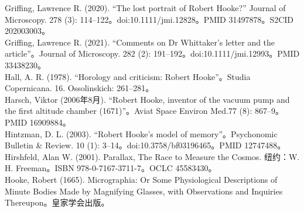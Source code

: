 Griffing, Lawrence R. (2020). “The lost portrait of Robert Hooke?” Journal of Microscopy. 278 (3): 114–122。doi:10.1111/jmi.12828。PMID 31497878。S2CID 202003003。\\
Griffing, Lawrence R. (2021). “Comments on Dr Whittaker's letter and the article”。Journal of Microscopy. 282 (2): 191–192。doi:10.1111/jmi.12993。PMID 33438230。\\
Hall, A. R. (1978). “Horology and criticism: Robert Hooke”。Studia Copernicana. 16. Ossolinskich: 261–281。\\
Harsch, Viktor (2006年8月). “Robert Hooke, inventor of the vacuum pump and the first altitude chamber (1671)”。Aviat Space Environ Med.77 (8): 867–9。PMID 16909884。\\
Hintzman, D. L. (2003). “Robert Hooke's model of memory”。Psychonomic Bulletin & Review. 10 (1): 3–14。doi:10.3758/bf03196465。PMID 12747488。  
Hirshfeld, Alan W. (2001). Parallax, The Race to Measure the Cosmos. 纽约：W. H. Freeman。ISBN 978-0-7167-3711-7。OCLC 45583430。\\
Hooke, Robert (1665). Micrographia: Or Some Physiological Descriptions of Minute Bodies Made by Magnifying Glasses, with Observations and Inquiries Thereupon。皇家学会出版。\\